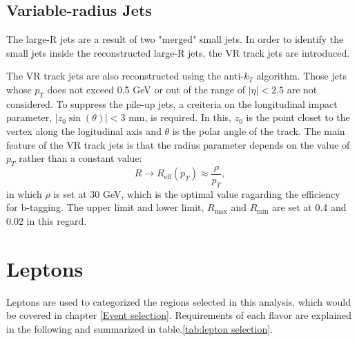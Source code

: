 \documentclass[class=NCU_thesis, crop=false]{standalone}
\begin{document}
	\subsection{Variable-radius Jets}\label{VR jets}
		The large-R jets are a result of two "merged" small jets. In order to identify the small jets inside the reconstructed large-R jets, the VR track jets are introduced.
	
		The VR track jets are also reconstructed using the anti-$k_T$ algorithm. Those jets whose $p_T$ does not exceed 0.5 GeV or out of the range of $\lvert \eta \rvert < 2.5$ are not considered. To suppress the pile-up jets, a creiteria on the longitudinal impact parameter, $\lvert z_0 \sin(\theta) \rvert < 3$ mm, is required. In this, $z_0$ is the point closet to the vertex along the logitudinal axis and $\theta$ is the polar angle of the track. The main feature of the VR track jets is that the radius parameter depends on the value of $p_T$ rather than a constant value:
		\begin{equation}
			R \rightarrow R_{\mathrm{eff}}(p_T) \approx \frac{\rho}{p_T},
		\end{equation}
		in which $\rho$ is set at 30 GeV, which is the optimal value ragarding the efficiency for b-tagging. The upper limit and lower limit, $R_{\mathrm{max}}$ and $R_{\mathrm{min}}$ are set at 0.4 and 0.02 in this regard.
	
\section{Leptons}
	Leptons are used to categorized the regions selected in this analysis, which would be covered in chapter \ref{Event selection}. Requirements of each flavor are explained in the following and summarized in table.\ref{tab:lepton selection}.
	
\end{document}
